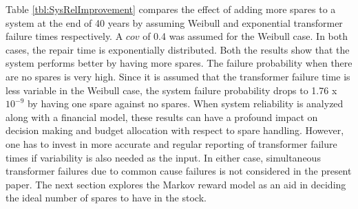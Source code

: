\documentclass[letterpaper, 12pt]{article}
\begin{document}
Table \ref{tbl:SysRelImprovement} compares the effect of adding more spares to a system at the end of 40 years by assuming Weibull and exponential transformer failure times respectively. A $cov$ of 0.4 was assumed for the Weibull case.
In both cases, the repair time is exponentially distributed. Both the results show that the system performs better by having more spares. The failure probability when there are no spares is very high. Since it is assumed that the transformer failure time is less variable in the Weibull case, the system failure probability drops to 1.76 x $10^{-9}$ by having one spare against no spares. 
When system reliability is analyzed along with a financial model, these results can have a profound impact on decision making and budget allocation with respect to spare handling. However, one has to invest in more accurate and regular reporting of transformer failure times if variability is also needed as the input. In either case, simultaneous transformer failures due to common cause failures is not considered in the present paper. The next section explores the Markov reward model as an aid in deciding the ideal number of spares to have in the stock.


\end{document}
